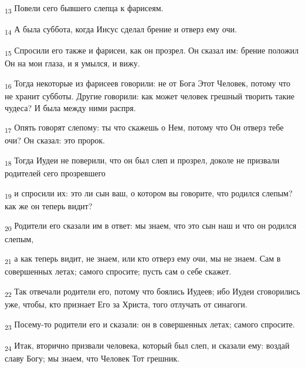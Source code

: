 \begin{tcolorbox}
\textsubscript{13} Повели сего бывшего слепца к фарисеям.
\end{tcolorbox}
\begin{tcolorbox}
\textsubscript{14} А была суббота, когда Иисус сделал брение и отверз ему очи.
\end{tcolorbox}
\begin{tcolorbox}
\textsubscript{15} Спросили его также и фарисеи, как он прозрел. Он сказал им: брение положил Он на мои глаза, и я умылся, и вижу.
\end{tcolorbox}
\begin{tcolorbox}
\textsubscript{16} Тогда некоторые из фарисеев говорили: не от Бога Этот Человек, потому что не хранит субботы. Другие говорили: как может человек грешный творить такие чудеса? И была между ними распря.
\end{tcolorbox}
\begin{tcolorbox}
\textsubscript{17} Опять говорят слепому: ты что скажешь о Нем, потому что Он отверз тебе очи? Он сказал: это пророк.
\end{tcolorbox}
\begin{tcolorbox}
\textsubscript{18} Тогда Иудеи не поверили, что он был слеп и прозрел, доколе не призвали родителей сего прозревшего
\end{tcolorbox}
\begin{tcolorbox}
\textsubscript{19} и спросили их: это ли сын ваш, о котором вы говорите, что родился слепым? как же он теперь видит?
\end{tcolorbox}
\begin{tcolorbox}
\textsubscript{20} Родители его сказали им в ответ: мы знаем, что это сын наш и что он родился слепым,
\end{tcolorbox}
\begin{tcolorbox}
\textsubscript{21} а как теперь видит, не знаем, или кто отверз ему очи, мы не знаем. Сам в совершенных летах; самого спросите; пусть сам о себе скажет.
\end{tcolorbox}
\begin{tcolorbox}
\textsubscript{22} Так отвечали родители его, потому что боялись Иудеев; ибо Иудеи сговорились уже, чтобы, кто признает Его за Христа, того отлучать от синагоги.
\end{tcolorbox}
\begin{tcolorbox}
\textsubscript{23} Посему-то родители его и сказали: он в совершенных летах; самого спросите.
\end{tcolorbox}
\begin{tcolorbox}
\textsubscript{24} Итак, вторично призвали человека, который был слеп, и сказали ему: воздай славу Богу; мы знаем, что Человек Тот грешник.
\end{tcolorbox}
